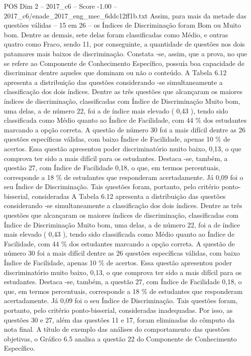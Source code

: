 \begin{textsample}{POS Dim 2 – 2017\_c6 – Score -1.00 – 2017\_c6/enade\_2017\_eng\_mec\_6ddc12ff1b.txt}
Assim, para mais da metade das questões válidas – 15 em 26 – os Índices de Discriminação foram Bom ou Muito bom.
Dentre as demais, sete delas foram classificadas como Médio, e outras quatro como Fraco, sendo 11, por conseguinte, a quantidade de questões nos dois patamares mais baixos de discriminação.
Constata -se, assim, que a prova, no que se refere ao Componente de Conhecimento Específico, possuía boa capacidade de discriminar dentre aqueles que dominam ou não o conteúdo.
A Tabela 6.12 apresenta a distribuição das questões considerando -se simultaneamente a classificação dos dois índices.
Dentre as três questões que alcançaram os maiores índices de discriminação, classificadas com Índice de Discriminação Muito bom, uma delas, a de número 22, foi a de índice mais elevado ( 0,43 ), tendo sido classificada como Médio quanto ao Índice de Facilidade, com 44 \% dos estudantes marcando a opção correta.
A questão de número 30 foi a mais difícil dentre as 26 questões específicas válidas, com baixo Índice de Facilidade, apenas 10 \% de acertos.
Essa questão apresentou poder discriminatório muito baixo, 0,13, o que comprova ter sido a mais difícil para os estudantes.
Destaca -se, também, a questão 27, com Índice de Facilidade 0,18, o que, em termos percentuais, corresponde a 18 \% de estudantes que responderam acertadamente.
Já 0,09 foi o seu Índice de Discriminação.
Tais questões foram, portanto, pelo critério ponto-bisserial, consideradas A Tabela 6.12 apresenta a distribuição das questões considerando -se simultaneamente a classificação dos dois índices.
Dentre as três questões que alcançaram os maiores índices de discriminação, classificadas com Índice de Discriminação Muito bom, uma delas, a de número 22, foi a de índice mais elevado ( 0,43 ), tendo sido classificada como Médio quanto ao Índice de Facilidade, com 44 \% dos estudantes marcando a opção correta.
A questão de número 30 foi a mais difícil dentre as 26 questões específicas válidas, com baixo Índice de Facilidade, apenas 10 \% de acertos.
Essa questão apresentou poder discriminatório muito baixo, 0,13, o que comprova ter sido a mais difícil para os estudantes.
Destaca -se, também, a questão 27, com Índice de Facilidade 0,18, o que, em termos percentuais, corresponde a 18 \% de estudantes que responderam acertadamente.
Já 0,09 foi o seu Índice de Discriminação.
Tais questões foram, portanto, pelo critério ponto-bisserial, consideradas inadequadas.
Por isso, as questões 30 e 27, além das questões 11 e 17, foram eliminadas do cômputo da nota final.
A título de exemplo das análises do comportamento das questões objetivas, o Gráfico 6.5 analisa a questão 22 do Componente de Conhecimento Específico.

\end{textsample}
